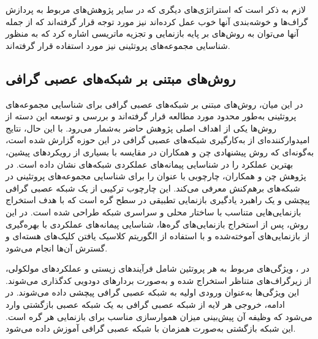 \begin{itemize}
\end{itemize}


لازم به ذکر است که استراتژی‌های دیگری که در سایر پژوهش‌های مربوط به پردازش گراف‌ها و خوشه‌بندی آنها خوب عمل کرده‌اند نیز مورد توجه قرار گرفته‌اند که از جمله آنها می‌توان به روش‌های بر پایه بازنمایی \cite{2018embeding} و تجزیه ماتریسی \cite{2020integrative} اشاره کرد که به منظور شناسایی مجموعه‌های پروتئینی نیز مورد استفاده قرار گرفته‌اند. 
\subsection{روش‌های مبتنی بر شبکه‌های عصبی گرافی}
در این میان، روش‌های مبتنی بر شبکه‌های عصبی گرافی برای شناسایی مجموعه‌های پروتئینی به‌طور محدود مورد مطالعه قرار گرفته‌اند و بررسی و توسعه این دسته از روش‌ها یکی از اهداف اصلی پژوهش حاضر به‌شمار می‌رود. با این حال، نتایج امیدوارکننده‌ای از به‌کارگیری شبکه‌های عصبی گرافی در این حوزه گزارش شده است، به‌گونه‌ای که روش پیشنهادی چن و همکاران \cite{chen2023adappi} در مقایسه با بسیاری از رویکردهای پیشین، بهترین عملکرد را در شناسایی پیمانه‌های عملکردی شبکه‌های  نشان داده است.
در پژوهش چن و همکاران، چارچوبی با عنوان  را برای شناسایی مجموعه‌های پروتئینی در شبکه‌های برهم‌کنش  معرفی می‌کند. این چارچوب ترکیبی از یک شبکه عصبی گرافی پیچشی و یک راهبرد یادگیری بازنمایی تطبیقی در سطح گره است که با هدف استخراج بازنمایی‌هایی متناسب با ساختار محلی و سراسری شبکه طراحی شده است. در این روش، پس از استخراج بازنمایی‌های گره‌ها، شناسایی پیمانه‌های عملکردی با بهره‌گیری از بازنمایی‌های آموخته‌شده و با استفاده از الگوریتم کلاسیک یافتن کلیک‌های هسته‌ای و گسترش آن‌ها انجام می‌شود.

در ، ویژگی‌های مربوط به  هر پروتئین شامل فرآیندهای زیستی و عملکردهای مولکولی، از زیرگراف‌های متناظر استخراج شده و به‌صورت بردارهای دودویی کدگذاری می‌شوند. این ویژگی‌ها به‌عنوان ورودی اولیه به شبکه عصبی گرافی پیچشی داده می‌شوند. در ادامه، خروجی هر لایه از شبکه عصبی گرافی به یک شبکه عصبی بازگشتی وارد می‌شود که وظیفه آن پیش‌بینی میزان هموارسازی مناسب برای بازنمایی هر گره است. این شبکه بازگشتی به‌صورت همزمان با شبکه عصبی گرافی آموزش داده می‌شود.

